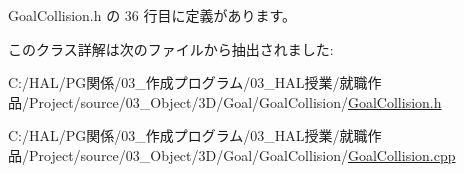  Goal\+Collision.\+h の 36 行目に定義があります。



このクラス詳解は次のファイルから抽出されました\+:\begin{DoxyCompactItemize}
\item 
C\+:/\+H\+A\+L/\+P\+G関係/03\+\_\+作成プログラム/03\+\_\+\+H\+A\+L授業/就職作品/\+Project/source/03\+\_\+\+Object/3\+D/\+Goal/\+Goal\+Collision/\mbox{\hyperlink{_goal_collision_8h}{Goal\+Collision.\+h}}\item 
C\+:/\+H\+A\+L/\+P\+G関係/03\+\_\+作成プログラム/03\+\_\+\+H\+A\+L授業/就職作品/\+Project/source/03\+\_\+\+Object/3\+D/\+Goal/\+Goal\+Collision/\mbox{\hyperlink{_goal_collision_8cpp}{Goal\+Collision.\+cpp}}\end{DoxyCompactItemize}
